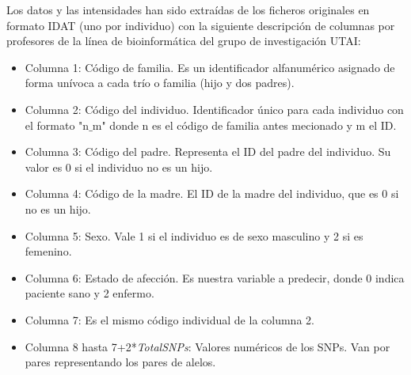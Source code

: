 Los datos y las intensidades han sido extraídas de los ficheros originales en formato IDAT (uno por individuo) con la siguiente descripción de columnas por profesores de la línea de bioinformática del grupo de investigación UTAI:
\begin{itemize}
  \item Columna 1: Código de familia. Es un identificador alfanumérico asignado de forma unívoca a cada trío o familia (hijo y dos padres).
  \item Columna 2: Código del individuo. Identificador único para cada individuo con el formato "n$\_$m" donde n es el código de familia antes mecionado y m el ID.
  \item Columna 3: Código del padre. Representa el ID del padre del individuo. Su valor es $0$ si el individuo no es un hijo.
  \item Columna 4: Código de la madre. El ID de la madre del individuo, que es $0$ si no es un hijo.
  \item Columna 5: Sexo. Vale 1 si el individuo es de sexo masculino y 2 si es femenino.
  \item Columna 6: Estado de afección. Es nuestra variable a predecir, donde $0$ indica paciente sano y 2 enfermo.
  \item Columna 7: Es el mismo código individual de la columna 2.
  \item Columna 8 hasta 7+2*\textit{TotalSNPs}: Valores numéricos de los SNPs. Van por pares representando los pares de alelos.
  \end{itemize}

